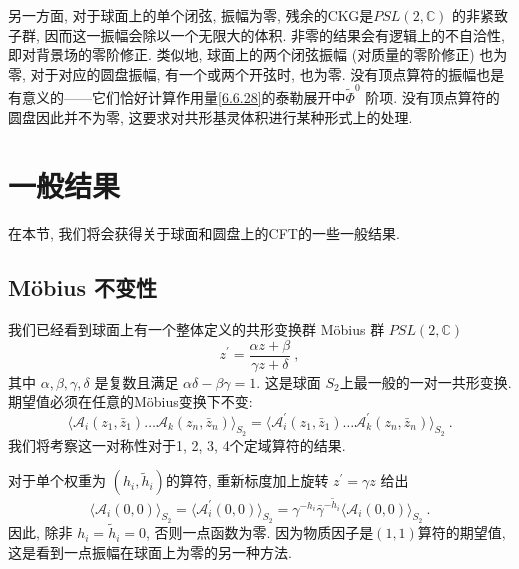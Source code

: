 另一方面, 对于球面上的单个闭弦, 振幅为零, 残余的CKG是$PSL(2, \mathds{C})$ 的非紧致子群, 因而这一振幅会除以一个无限大的体积. 
非零的结果会有逻辑上的不自洽性, 即对背景场的零阶修正. 类似地, 球面上的两个闭弦振幅 (对质量的零阶修正) 也为零, 对于对应的圆盘振幅, 有一个或两个开弦时, 也为零. 
没有顶点算符的振幅也是有意义的——它们恰好计算作用量\eqref{6.6.28}的泰勒展开中$\tilde{\Phi}^{0}$ 阶项. 
没有顶点算符的圆盘因此并不为零, 这要求对共形基灵体积进行某种形式上的处理.

\section{一般结果}  \label{sec:6.7}%

在本节, 我们将会获得关于球面和圆盘上的CFT的一些一般结果.

\subsection*{M\"{o}bius 不变性}
我们已经看到球面上有一个整体定义的共形变换群 Möbius 群 $PSL(2, \mathds{C})$
\begin{equation}
	z^{\prime}=\frac{\alpha z+\beta}{\gamma z+\delta} \:, \label{6.7.1}
\end{equation}
其中 $\alpha, \beta, \gamma, \delta$ 是复数且满足 $\alpha \delta-\beta \gamma=1$. 这是球面 $S_{2}$上最一般的一对一共形变换. 
期望值必须在任意的M\"{o}bius变换下不变:
\begin{equation}
	\bigl\langle\mathscr{A}_{i}(z_{1}, \bar{z}_{1}) \ldots \mathscr{A}_{k}(z_{n}, \bar{z}_{n})\bigr\rangle_{S_{2}} =
	\bigl\langle\mathscr{A}_{i}^{\prime}(z_{1}, \bar{z}_{1}) \ldots \mathscr{A}_{k}^{\prime}(z_{n}, \bar{z}_{n})\bigr\rangle_{S_{2}} \:. 
	\label{6.7.2}
\end{equation}
我们将考察这一对称性对于1, 2, 3, 4个定域算符的结果.

对于单个权重为 $\left(h_{i}, \tilde{h}_{i}\right)$的算符, 重新标度加上旋转 $z^{\prime}=\gamma z$ 给出
\begin{equation}
	\bigl\langle\mathscr{A}_{i}(0,0)\bigr\rangle_{S_{2}} = \bigl\langle\mathscr{A}_{i}^{\prime}(0,0)\bigr\rangle_{S_{2}}
	=\gamma^{-h_{i}} \bar{\gamma}^{-\tilde{h}_{i}}\bigl\langle\mathscr{A}_{i}(0,0)\bigr\rangle_{S_{2}} \:. \label{6.7.3}
\end{equation}
因此, 除非 $h_{i}=\tilde{h}_{i}=0$, 否则一点函数为零. 因为物质因子是$(1,1)$算符的期望值, 这是看到一点振幅在球面上为零的另一种方法.

